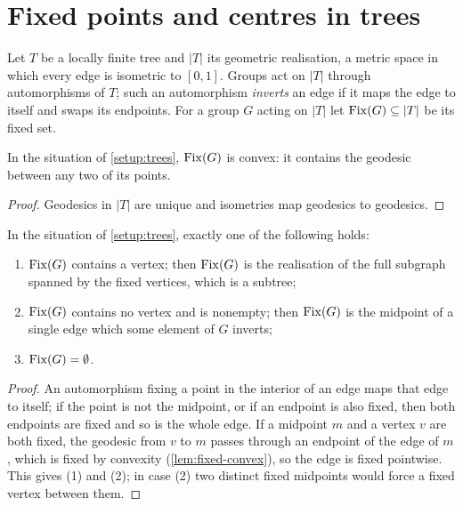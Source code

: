 \section{Fixed points and centres in trees}\label{sec:trees}

\begin{setup}[Trees]\label{setup:trees}
Let $T$ be a locally finite tree and $|T|$ its geometric realisation, a
metric space in which every edge is isometric to $[0,1]$. Groups act on
$|T|$ through automorphisms of $T$; such an automorphism \emph{inverts} an
edge if it maps the edge to itself and swaps its endpoints. For a group
$G$ acting on $|T|$ let $\mathrm{Fix}(G) \subseteq |T|$ be its fixed set.
\end{setup}

\begin{lemma}\label{lem:fixed-convex}
In the situation of \cref{setup:trees}, $\mathrm{Fix}(G)$ is convex: it
contains the geodesic between any two of its points.
\end{lemma}

\begin{proof}
Geodesics in $|T|$ are unique and isometries map geodesics to geodesics.
\end{proof}

\begin{lemma}\label{lem:fixed-shape}
In the situation of \cref{setup:trees}, exactly one of the following
holds:
\begin{enumerate}
\item $\mathrm{Fix}(G)$ contains a vertex; then $\mathrm{Fix}(G)$ is the
  realisation of the full subgraph spanned by the fixed vertices, which is
  a subtree;
\item $\mathrm{Fix}(G)$ contains no vertex and is nonempty; then
  $\mathrm{Fix}(G)$ is the midpoint of a single edge which some element of
  $G$ inverts;
\item $\mathrm{Fix}(G) = \emptyset$.
\end{enumerate}
\end{lemma}

\begin{proof}
An automorphism fixing a point in the interior of an edge maps that edge
to itself; if the point is not the midpoint, or if an endpoint is also
fixed, then both endpoints are fixed and so is the whole edge. If a
midpoint $m$ and a vertex $v$ are both fixed, the geodesic from $v$ to $m$
passes through an endpoint of the edge of $m$, which is fixed by
convexity (\cref{lem:fixed-convex}), so the edge is fixed pointwise. This
gives (1) and (2); in case (2) two distinct fixed midpoints would force a
fixed vertex between them.
\end{proof}

